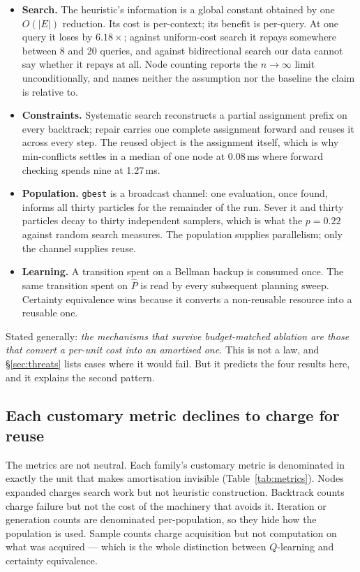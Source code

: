 \documentclass[11pt]{article}
\begin{document}
\begin{itemize}[leftmargin=1.4em, itemsep=3pt]
\item \textbf{Search.} The heuristic's information is a global constant obtained by one $O(|E|)$
  reduction. Its cost is per-context; its benefit is per-query. At one query it loses by
  $6.18\times$; against uniform-cost search it repays somewhere between 8 and 20 queries, and
  against bidirectional search our data cannot say whether it repays at all. Node counting reports
  the $n \to \infty$ limit unconditionally, and names neither the assumption nor the baseline the
  claim is relative to.
\item \textbf{Constraints.} Systematic search reconstructs a partial assignment prefix on every
  backtrack; repair carries one complete assignment forward and reuses it across every step. The
  reused object is the assignment itself, which is why min-conflicts settles in a median of one
  node at 0.08\,ms where forward checking spends nine at 1.27\,ms.
\item \textbf{Population.} \texttt{gbest} is a broadcast channel: one evaluation, once found,
  informs all thirty particles for the remainder of the run. Sever it and thirty particles decay to
  thirty independent samplers, which is what the $p = 0.22$ against random search measures. The
  population supplies parallelism; only the channel supplies reuse.
\item \textbf{Learning.} A transition spent on a Bellman backup is consumed once. The same
  transition spent on $\hat{P}$ is read by every subsequent planning sweep. Certainty equivalence
  wins because it converts a non-reusable resource into a reusable one.
\end{itemize}

Stated generally: \emph{the mechanisms that survive budget-matched ablation are those that convert
a per-unit cost into an amortised one.} This is not a law, and \S\ref{sec:threats} lists cases
where it would fail. But it predicts the four results here, and it explains the second pattern.

\subsection{Each customary metric declines to charge for reuse}

The metrics are not neutral. Each family's customary metric is denominated in exactly the unit that
makes amortisation invisible (Table~\ref{tab:metrics}). Nodes expanded charges search work but not
heuristic construction. Backtrack counts charge failure but not the cost of the machinery that
avoids it. Iteration or generation counts are denominated per-population, so they hide how the
population is used. Sample counts charge acquisition but not computation on what was acquired ---
which is the whole distinction between $Q$-learning and certainty equivalence.
\end{document}
